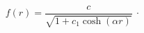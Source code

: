\begin{equation}
f(r)=\frac{c}{\sqrt{1+c_{1}\cosh \left( \alpha r\right) }}\ \cdot
\label{WSsym}
\end{equation}%
